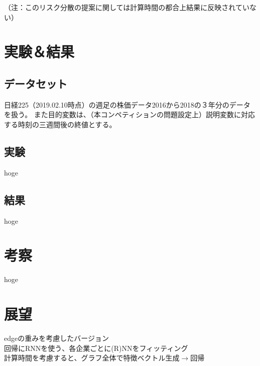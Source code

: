 \documentclass[twocolumn,10.5pt]{article}           %
\begin{document}
（注：このリスク分散の提案に関しては計算時間の都合上結果に反映されていない）

\section{実験＆結果}
\subsection{データセット}
日経225（2019.02.10時点）の週足の株価データ2016から2018の３年分のデータを扱う。
また目的変数は、（本コンペティションの問題設定上）説明変数に対応する時刻の三週間後の終値とする。

\subsection{実験}
hoge
\subsection{結果}
hoge

\section{考察}
hoge

\section{展望}
edgeの重みを考慮したバージョン\\
回帰にRNNを使う、各企業ごとに(R)NNをフィッティング\\
計算時間を考慮すると、グラフ全体で特徴ベクトル生成$\to$回帰



\end{document}

